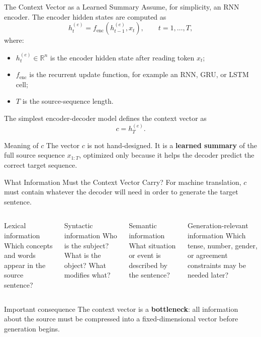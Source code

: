 \documentclass[aspectratio=169]{beamer}
\begin{document}
\begin{frame}{The Context Vector as a Learned Summary}
\small
Assume, for simplicity, an RNN encoder. The encoder hidden states are computed as
\[
  h^{(e)}_t = f_{\mathrm{enc}}\left(h^{(e)}_{t-1}, x_t\right),
  \qquad t=1,\ldots,T,
\]
where:
\begin{itemize}
  \item $h^{(e)}_t \in \mathbb{R}^{n}$ is the encoder hidden state after reading token $x_t$;
  \item $f_{\mathrm{enc}}$ is the recurrent update function, for example an RNN, GRU, or LSTM cell;
  \item $T$ is the source-sequence length.
\end{itemize}

\vspace{0.2cm}
The simplest encoder-decoder model defines the context vector as
\[
  c = h^{(e)}_T.
\]

\begin{block}{Meaning of $c$}
The vector $c$ is not hand-designed. It is a \textbf{learned summary} of the full source sequence $x_{1:T}$, optimized only because it helps the decoder predict the correct target sequence.
\end{block}
\end{frame}
%
%
\begin{frame}{What Information Must the Context Vector Carry?}
\small
For machine translation, $c$ must contain whatever the decoder will need in order to generate the target sentence.

\vspace{0.25cm}
\begin{columns}[T,onlytextwidth]
\begin{block}{Lexical information}
Which concepts and words appear in the source sentence?
\end{block}
\begin{block}{Syntactic information}
Who is the subject? What is the object? What modifies what?
\end{block}

\begin{block}{Semantic information}
What situation or event is described by the sentence?
\end{block}
\begin{block}{Generation-relevant information}
Which tense, number, gender, or agreement constraints may be needed later?
\end{block}
\end{columns}

\vspace{0.25cm}
\begin{alertblock}{Important consequence}
The context vector is a \textbf{bottleneck}: all information about the source must be compressed into a fixed-dimensional vector before generation begins.
\end{alertblock}
\end{frame}
\end{document}
